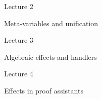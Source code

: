 \documentclass[10pt]{beamer}
\begin{document}


\begin{frame}
  \begin{center}
    \Huge Lecture 2

    \bigskip

    \Large
    Meta-variables and unification
  \end{center}
\end{frame}



\begin{frame}
  \begin{center}
    \Huge Lecture 3

    \bigskip

    \Large
    Algebraic effects and handlers
  \end{center}
\end{frame}



\begin{frame}
  \begin{center}
    \Huge Lecture 4

    \bigskip

    \Large
    Effects in proof assistants
  \end{center}
\end{frame}

\end{document}
